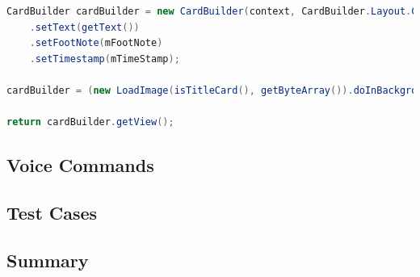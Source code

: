 \begin{lstlisting}[language=Java, caption={Initialisation of the CardBuilder class}, label=cardBuilderPlugPlay]
CardBuilder cardBuilder = new CardBuilder(context, CardBuilder.Layout.COLUMNS)
	.setText(getText())
	.setFootNote(mFootNote)
	.setTimestamp(mTimeStamp);

cardBuilder = (new LoadImage(isTitleCard(), getByteArray()).doInBackground(cardBuilder));

return cardBuilder.getView();
\end{lstlisting}


\subsection{Voice Commands}


\subsection{Test Cases}


\subsection{Summary}
\label{subsec:summary}



% 
